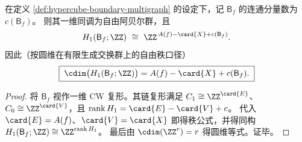 \begin{proposition}[回路圆维的欧拉恒等式]\label{prop:hypercube-boundary-multigraph-h1-cdim}
在定义 \ref{def:hypercube-boundary-multigraph} 的设定下，记 \(\mathsf B_f\) 的连通分量数为 \(c(\mathsf B_f)\)。
则其一维同调为自由阿贝尔群，且
\[
H_1(\mathsf B_f;\ZZ)\ \cong\ \ZZ^{\,A(f)-\card{X}+c(\mathsf B_f)}.
\]
因此（按圆维在有限生成交换群上的自由秩口径）
\[
\boxed{\;
\cdim\bigl(H_1(\mathsf B_f;\ZZ)\bigr)=A(f)-\card{X}+c(\mathsf B_f).
\;}
\]
\end{proposition}

\begin{proof}
将 \(\mathsf B_f\) 视作一维 CW 复形。其链复形满足 \(C_1\cong \ZZ^{\card{E}}\)、\(C_0\cong \ZZ^{\card{V}}\)，且
\(
\operatorname{rank}H_1=\card{E}-\card{V}+c
\)。
代入 \(\card{E}=A(f)\)、\(\card{V}=\card{X}\) 即得秩公式，并得同构 \(H_1(\mathsf B_f;\ZZ)\cong \ZZ^{\operatorname{rank}H_1}\)。
最后由 \(\cdim(\ZZ^r)=r\) 得圆维等式。证毕。
\end{proof}



